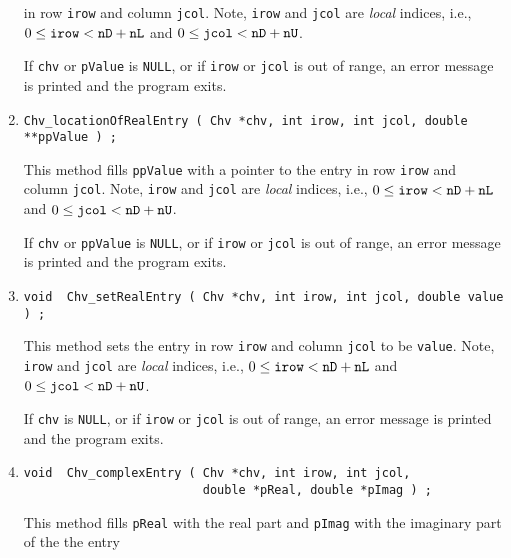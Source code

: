 \begin{enumerate}
in row {\tt irow} and column {\tt jcol}.
Note, {\tt irow} and {\tt jcol} are {\it local} indices,
i.e., $0 \le \mbox{\tt irow} < \mbox{\tt nD} + \mbox{\tt nL}$
and $0 \le \mbox{\tt jcol} < \mbox{\tt nD} + \mbox{\tt nU}$.
\par {}
If {\tt chv} or {\tt pValue} is {\tt NULL},
or if {\tt irow} or {\tt jcol} is out of range,
an error message is printed and the program exits.
\item
\begin{verbatim}
Chv_locationOfRealEntry ( Chv *chv, int irow, int jcol, double **ppValue ) ;
\end{verbatim}
This method fills {\tt *ppValue} with a pointer to the 
entry in row {\tt irow} and column {\tt jcol}.
Note, {\tt irow} and {\tt jcol} are {\it local} indices,
i.e., $0 \le \mbox{\tt irow} < \mbox{\tt nD} + \mbox{\tt nL}$
and $0 \le \mbox{\tt jcol} < \mbox{\tt nD} + \mbox{\tt nU}$.
\par {}
If {\tt chv} or {\tt ppValue} is {\tt NULL},
or if {\tt irow} or {\tt jcol} is out of range,
an error message is printed and the program exits.
\item
\begin{verbatim}
void  Chv_setRealEntry ( Chv *chv, int irow, int jcol, double value ) ;
\end{verbatim}
This method sets the entry in row {\tt irow} and column {\tt jcol} 
to be {\tt value}.
Note, {\tt irow} and {\tt jcol} are {\it local} indices,
i.e., $0 \le \mbox{\tt irow} < \mbox{\tt nD} + \mbox{\tt nL}$
and $0 \le \mbox{\tt jcol} < \mbox{\tt nD} + \mbox{\tt nU}$.
\par {}
If {\tt chv} is {\tt NULL},
or if {\tt irow} or {\tt jcol} is out of range,
an error message is printed and the program exits.
\item
\begin{verbatim}
void  Chv_complexEntry ( Chv *chv, int irow, int jcol, 
                         double *pReal, double *pImag ) ;
\end{verbatim}
This method fills {\tt *pReal} with the real part and
{\tt *pImag} with the imaginary part of the the entry 

\end{enumerate}
